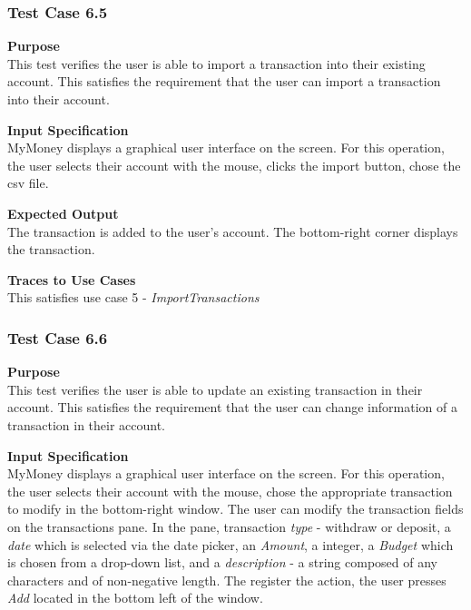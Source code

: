 \documentclass[12pt]{article}
\begin{document}
\subsubsection{Test Case 6.5} \label{6.5}

\noindent
{\bf Purpose}\\
This test verifies the user is able to import a transaction into their existing account.
This satisfies the requirement that the user can import a transaction into their account.
                                                        

\noindent
{\bf Input Specification}\\
MyMoney displays a graphical user interface on the screen.
For this operation, the user selects their account with the mouse,
clicks the import button, chose the csv file.
                                                          

\noindent
{\bf Expected Output}\\
The transaction is added to the user's account.
The bottom-right corner displays the transaction.


\noindent
{\bf Traces to Use Cases}\\
This satisfies use case 5 - \textit{ImportTransactions}



\subsubsection{Test Case 6.6} \label{6.6}
\noindent
{\bf Purpose}\\
This test verifies the user is able to update an existing transaction in their account.
This satisfies the requirement that the user can change information of a transaction in their account.
                                                        

\noindent
{\bf Input Specification}\\
MyMoney displays a graphical user interface on the screen.
For this operation, the user selects their account with the mouse,
chose the appropriate transaction to modify in the bottom-right window.
The user can modify the transaction fields on the transactions pane.
In the pane, transaction \textit{type} - withdraw or deposit, a \textit{date}
which is selected via the date picker, an \textit{Amount}, a integer, a \textit{Budget} which is chosen
from a drop-down list, and a \textit{description} - a string composed of any characters and
of non-negative length. The register the action, the user presses \textit{Add} located in the bottom left
of the window.   
                                                          
\end{document}
